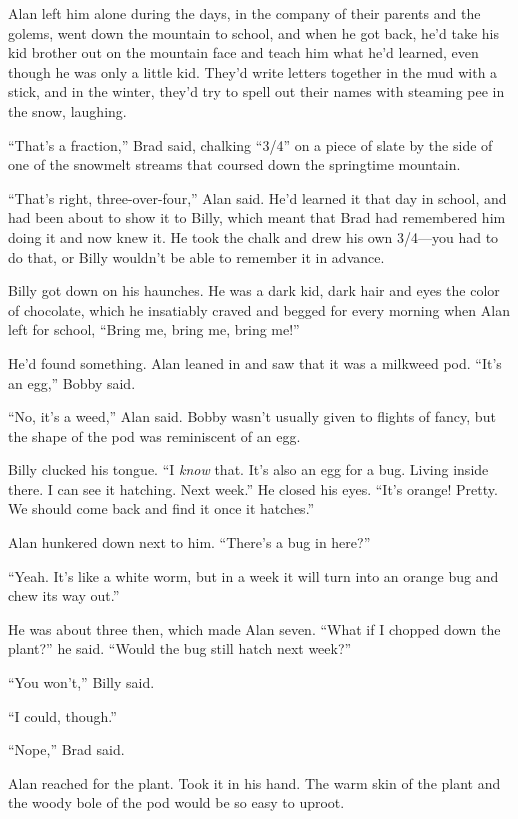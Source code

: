 \documentclass{article}
\begin{document}
Alan left him alone during the days, in the company of their parents
and the golems, went down the mountain to school, and when he got
back, he'd take his kid brother out on the mountain face and teach him
what he'd learned, even though he was only a little kid.  They'd write
letters together in the mud with a stick, and in the winter, they'd
try to spell out their names with steaming pee in the snow, laughing.

``That's a fraction,'' Brad said, chalking ``3/4'' on a piece of slate
by the side of one of the snowmelt streams that coursed down the
springtime mountain.

``That's right, three-over-four,'' Alan said.  He'd learned it that
day in school, and had been about to show it to Billy, which meant
that Brad had remembered him doing it and now knew it.  He took the
chalk and drew his own 3/4---you had to do that, or Billy wouldn't be
able to remember it in advance.

Billy got down on his haunches.  He was a dark kid, dark hair and eyes
the color of chocolate, which he insatiably craved and begged for
every morning when Alan left for school, ``Bring me, bring me, bring
me!''

He'd found something.  Alan leaned in and saw that it was a milkweed
pod.  ``It's an egg,'' Bobby said.

``No, it's a weed,'' Alan said.  Bobby wasn't usually given to flights
of fancy, but the shape of the pod was reminiscent of an egg.

Billy clucked his tongue.  ``I \textit{know} that.  It's also an egg
for a bug.  Living inside there.  I can see it hatching.  Next week.''
He closed his eyes.  ``It's orange!  Pretty.  We should come back and
find it once it hatches.''

Alan hunkered down next to him.  ``There's a bug in here?''

``Yeah.  It's like a white worm, but in a week it will turn into an
orange bug and chew its way out.''

He was about three then, which made Alan seven.  ``What if I chopped
down the plant?'' he said.  ``Would the bug still hatch next week?''

``You won't,'' Billy said.

``I could, though.''

``Nope,'' Brad said.

Alan reached for the plant.  Took it in his hand.  The warm skin of
the plant and the woody bole of the pod would be so easy to uproot.
\end{document}
